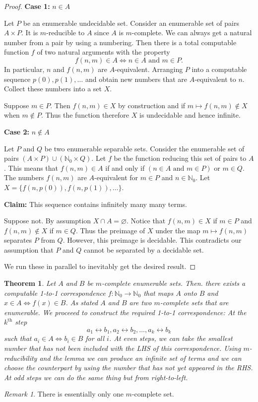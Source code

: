 \documentclass[10pt, letterpaper]{article}
\newcommand{\N}{\mathbb{N}}
\newtheorem{thm}{Theorem}
\theoremstyle{remark}
\newtheorem{rem}{Remark}
\theoremstyle{definition}
\begin{document}
    \begin{proof}
        \textbf{Case 1: } $n \in A$

        Let $P$ be an enumerable undecidable set. Consider an enumerable set of pairs $A \times P$. It is $m$-reducible to $A$ since $A$ 
        is $m$-complete. We can always get a natural number from a pair by using a numbering. Then there is a total computable function $f$ 
        of two natural arguments with the property 
        \[
            f(n,m) \in A \Leftrightarrow n \in A \text{ and } m \in P.
        \]
        In particular, $n$ and $f(n,m)$ are $A$-equivalent. Arranging $P$ into a computable sequence $p(0), p(1), \ldots$ and obtain new numbers that 
        are $A$-equivalent to $n$. Collect these numbers into a set $X$.

        Suppose $m \in P$. Then $f(n,m) \in X$ by construction and if $m \mapsto f(n,m) \notin X$ when $m \notin P$. Thus the function therefore $X$  is 
        undecidable and hence infinite.

        \textbf{Case 2: } $n \notin A$

        Let $P$ and $Q$ be two enumerable separable sets. Consider the enumerable set of pairs $(A \times P) \cup (\N_0 \times Q)$. Let $f$ 
        be the function reducing this set of pairs to $A$. This means that $f(n,m) \in A$ if and only if $(n \in A \text{ and } m \in P)$ or $m \in Q$.
        The numbers $f(n,m)$ are $A$-equivalent for $m \in P$ and $n \in \N_0$. Let $X = \{f(n,p(0)), f(n,p(1)), \ldots\}$.

        \textbf{Claim: } This sequence contains infinitely many many terms.

        Suppose not. By assumption $X \cap A = \varnothing$. Notice that $f(n,m) \in X$ if $m \in P$ and $f(n,m) \notin X$ if $m \in Q$. Thus the 
        preimage of $X$ under the map $m \mapsto f(n,m)$ separates $P$ from $Q$. However, this preimage is decidable. This contradicts our 
        assumption that $P$ and $Q$ cannot be separated by a decidable set.

        We run these in parallel to inevitably get the desired result.
    \end{proof}

    \begin{thm}
        Let $A$ and $B$ be $m$-complete enumerable sets. Then. there exists a computable 1-to-1 correspondence $f:\N_0 \rightarrow \N_0$ that maps $A$
        onto $B$ and $x \in A \Leftrightarrow f(x) \in B$. As stated $A$ and $B$ are two $m$-complete sets that are enumerable. We proceeed to construct
        the required 1-to-1 correspondence: At the $k^{\text{th}}$ step 
        \[
            a_1 \leftrightarrow b_1, a_2 \leftrightarrow b_2, \ldots, a_k \leftrightarrow b_k
        \]
        such that $a_i \in A \Leftrightarrow b_i \in B$ for all $i$. At even steps, we can take the smallest number that has not been included with the 
        LHS of this correspondence. Using $m$-reducibility and the lemma we can produce an infinite set of terms and we can choose the counterpart by 
        using the number that has not yet appeared in the RHS. At odd steps we can do the same thing but from right-to-left.
    \end{thm}

    \begin{rem}
        There is essentially only one $m$-complete set.
    \end{rem}
\end{document}
